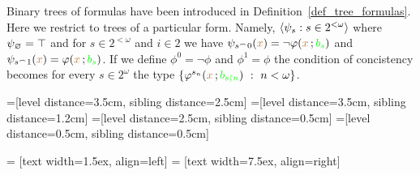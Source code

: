 Binary trees of formulas have been introduced in Definition~\ref{def_tree_formulas}.
Here we restrict to trees of a particular form.
Namely, $\langle\psi_s:s\in 2^{<\omega}\rangle$  where $\psi_\varnothing=\top$ and for $s\in 2^{<\omega}$ and $i\in 2$ we have $\psi_{s^\frown 0}({\color{brown} x})=\neg\varphi({\color{brown} x}\,;{\color{green} b_s})$ and $\psi_{s^\frown 1}({\color{brown} x})=\varphi({\color{brown} x}\,;{\color{green} b_s})$.
If we define $\phi^0=\neg\phi$ and $\phi^1=\phi$ the condition of concistency becomes for every $s\in 2^\omega$ the type $\{\varphi^{s_n}({\color{brown} x}\,;{\color{green} b_{s\restriction n}})\ :\ n<\omega\}$.


=[level distance=3.5cm, sibling distance=2.5cm]
=[level distance=3.5cm, sibling distance=1.2cm]
=[level distance=2.5cm, sibling distance=0.5cm]
=[level distance=0.5cm, sibling distance=0.5cm]

 = [text width=1.5ex, align=left]
 = [text width=7.5ex, align=right]

\def\leaf{...}

